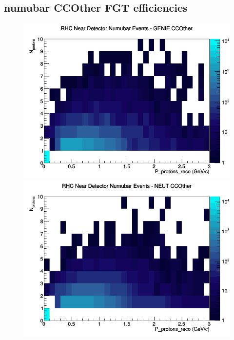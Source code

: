 \documentclass[12pt]{article}
\begin{document}
\subsection{numubar CCOther FGT efficiencies}
\begin{figure}[h]
\includegraphics[width=\linewidth]{eff_N_P/FGT/protons/CCOther_RHC_ND_numubar_N_P_GENIE.png}
\endminipage
{}
\includegraphics[width=\linewidth]{eff_N_P/FGT/protons/CCOther_RHC_ND_numubar_N_P_NEUT.png}
\endminipage
{}

\end{figure}
\end{document}
